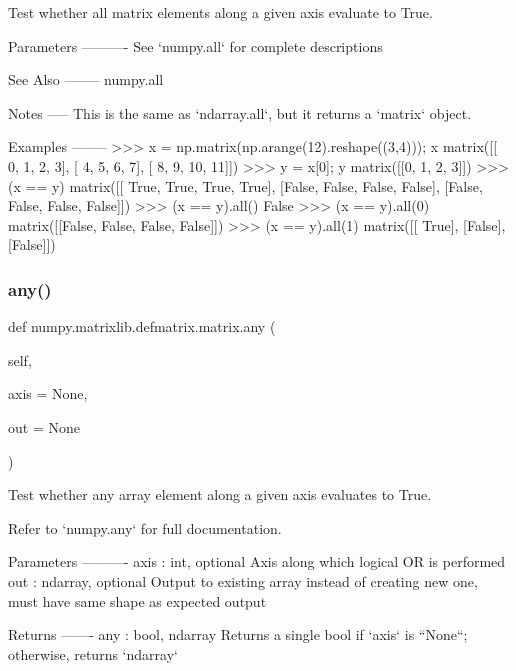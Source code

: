 \begin{DoxyVerb}Test whether all matrix elements along a given axis evaluate to True.

Parameters
----------
See `numpy.all` for complete descriptions

See Also
--------
numpy.all

Notes
-----
This is the same as `ndarray.all`, but it returns a `matrix` object.

Examples
--------
>>> x = np.matrix(np.arange(12).reshape((3,4))); x
matrix([[ 0,  1,  2,  3],
[ 4,  5,  6,  7],
[ 8,  9, 10, 11]])
>>> y = x[0]; y
matrix([[0, 1, 2, 3]])
>>> (x == y)
matrix([[ True,  True,  True,  True],
[False, False, False, False],
[False, False, False, False]])
>>> (x == y).all()
False
>>> (x == y).all(0)
matrix([[False, False, False, False]])
>>> (x == y).all(1)
matrix([[ True],
[False],
[False]])\end{DoxyVerb}
 \mbox{\label{classnumpy_1_1matrixlib_1_1defmatrix_1_1matrix_a51872cb8f9b78d599087930019515e6e}} 
\subsubsection{\texorpdfstring{any()}{any()}}
{\footnotesize\ttfamily def numpy.\+matrixlib.\+defmatrix.\+matrix.\+any (\begin{DoxyParamCaption}\item[{}]{self,  }\item[{}]{axis = {\ttfamily None},  }\item[{}]{out = {\ttfamily None} }\end{DoxyParamCaption})}

\begin{DoxyVerb}Test whether any array element along a given axis evaluates to True.

Refer to `numpy.any` for full documentation.

Parameters
----------
axis : int, optional
    Axis along which logical OR is performed
out : ndarray, optional
    Output to existing array instead of creating new one, must have
    same shape as expected output

Returns
-------
    any : bool, ndarray
Returns a single bool if `axis` is ``None``; otherwise,
returns `ndarray`\end{DoxyVerb}
 \mbox{\label{classnumpy_1_1matrixlib_1_1defmatrix_1_1matrix_a3695eced42ed9df40c9b9085fbd7de60}} 
